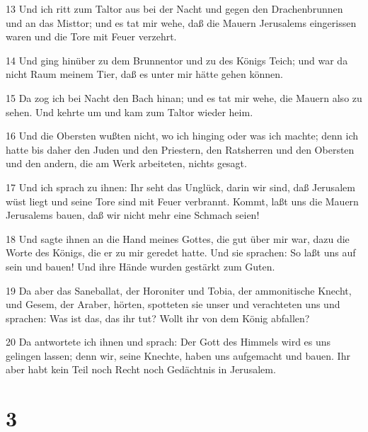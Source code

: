 \par 13 Und ich ritt zum Taltor aus bei der Nacht und gegen den Drachenbrunnen und an das Misttor; und es tat mir wehe, daß die Mauern Jerusalems eingerissen waren und die Tore mit Feuer verzehrt.
\par 14 Und ging hinüber zu dem Brunnentor und zu des Königs Teich; und war da nicht Raum meinem Tier, daß es unter mir hätte gehen können.
\par 15 Da zog ich bei Nacht den Bach hinan; und es tat mir wehe, die Mauern also zu sehen. Und kehrte um und kam zum Taltor wieder heim.
\par 16 Und die Obersten wußten nicht, wo ich hinging oder was ich machte; denn ich hatte bis daher den Juden und den Priestern, den Ratsherren und den Obersten und den andern, die am Werk arbeiteten, nichts gesagt.
\par 17 Und ich sprach zu ihnen: Ihr seht das Unglück, darin wir sind, daß Jerusalem wüst liegt und seine Tore sind mit Feuer verbrannt. Kommt, laßt uns die Mauern Jerusalems bauen, daß wir nicht mehr eine Schmach seien!
\par 18 Und sagte ihnen an die Hand meines Gottes, die gut über mir war, dazu die Worte des Königs, die er zu mir geredet hatte. Und sie sprachen: So laßt uns auf sein und bauen! Und ihre Hände wurden gestärkt zum Guten.
\par 19 Da aber das Saneballat, der Horoniter und Tobia, der ammonitische Knecht, und Gesem, der Araber, hörten, spotteten sie unser und verachteten uns und sprachen: Was ist das, das ihr tut? Wollt ihr von dem König abfallen?
\par 20 Da antwortete ich ihnen und sprach: Der Gott des Himmels wird es uns gelingen lassen; denn wir, seine Knechte, haben uns aufgemacht und bauen. Ihr aber habt kein Teil noch Recht noch Gedächtnis in Jerusalem.

\chapter{3}

